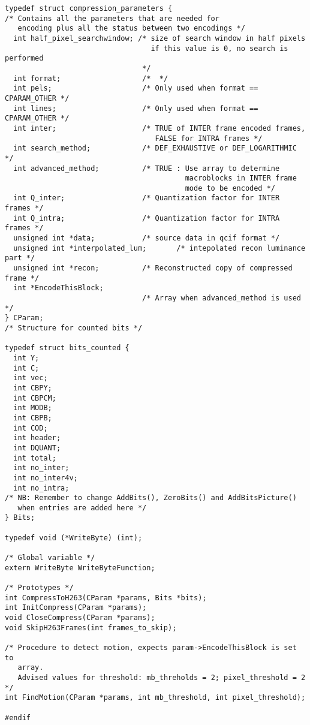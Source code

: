 \documentclass{article}
\begin{document}
\begin{verbatim}
typedef struct compression_parameters {
/* Contains all the parameters that are needed for 
   encoding plus all the status between two encodings */
  int half_pixel_searchwindow; /* size of search window in half pixels
                                  if this value is 0, no search is performed
                                */
  int format;                   /*  */
  int pels;                     /* Only used when format == CPARAM_OTHER */
  int lines;                    /* Only used when format == CPARAM_OTHER */
  int inter;                    /* TRUE of INTER frame encoded frames,
                                   FALSE for INTRA frames */
  int search_method;            /* DEF_EXHAUSTIVE or DEF_LOGARITHMIC */
  int advanced_method;          /* TRUE : Use array to determine 
                                          macroblocks in INTER frame
                                          mode to be encoded */
  int Q_inter;                  /* Quantization factor for INTER frames */
  int Q_intra;                  /* Quantization factor for INTRA frames */
  unsigned int *data;           /* source data in qcif format */
  unsigned int *interpolated_lum;       /* intepolated recon luminance part */
  unsigned int *recon;          /* Reconstructed copy of compressed frame */
  int *EncodeThisBlock; 
                                /* Array when advanced_method is used */
} CParam;
/* Structure for counted bits */

typedef struct bits_counted {
  int Y;
  int C;
  int vec;
  int CBPY;
  int CBPCM;
  int MODB;
  int CBPB;
  int COD;
  int header;
  int DQUANT;
  int total;
  int no_inter;
  int no_inter4v;
  int no_intra;
/* NB: Remember to change AddBits(), ZeroBits() and AddBitsPicture() 
   when entries are added here */
} Bits;

typedef void (*WriteByte) (int);

/* Global variable */
extern WriteByte WriteByteFunction;

/* Prototypes */
int CompressToH263(CParam *params, Bits *bits);
int InitCompress(CParam *params);
void CloseCompress(CParam *params);
void SkipH263Frames(int frames_to_skip);

/* Procedure to detect motion, expects param->EncodeThisBlock is set to
   array. 
   Advised values for threshold: mb_threholds = 2; pixel_threshold = 2 */
int FindMotion(CParam *params, int mb_threshold, int pixel_threshold);

#endif

\end{verbatim}
\end{document}
